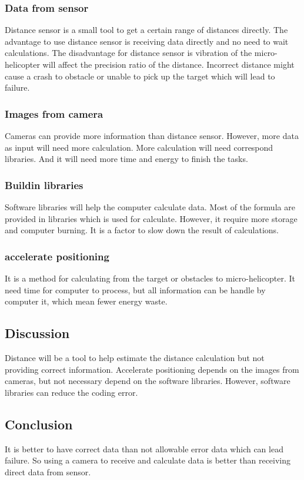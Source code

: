 \documentclass[onecolumn, draftclsnofoot,10pt, compsoc]{IEEEtran}
\begin{document}
\subsubsection{Data from sensor}
Distance sensor is a small tool to get a certain range of distances directly.
The advantage to use distance sensor is receiving data directly and no need to wait calculations.
The disadvantage for distance sensor is vibration of the micro-helicopter will affect the precision ratio of the distance.
Incorrect distance might cause a crash to obstacle or unable to pick up the target which will lead to failure.

\subsubsection{Images from camera}
Cameras can provide more information than distance sensor.
However, more data as input will need more calculation.
More calculation will need correspond libraries. And it will need more time and energy to finish the tasks.

\subsubsection{Buildin libraries}
Software libraries will help the computer calculate data. Most of the formula are provided in libraries which is used for calculate.
However, it require more storage and computer burning. It is a factor to slow down the result of calculations.

\subsubsection{accelerate positioning}
It is a method for calculating from the target or obstacles to micro-helicopter.
It need time for computer to process, but all information can be handle by computer it, which mean fewer energy waste.

\subsection{Discussion}
Distance will be a tool to help estimate the distance calculation but not providing correct information.
Accelerate positioning depends on the images from cameras, but not necessary depend on the software libraries.
However, software libraries can reduce the coding error.

\subsection{Conclusion}
It is better to have correct data than not allowable error data which can lead failure.
So using a camera to receive and calculate data is better than receiving direct data from sensor.



\vspace{2mm}



\end{document}
